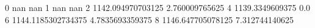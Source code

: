 0 nan nan
1 nan nan
2 1142.094970703125 2.760009765625
4 1139.3349609375 0.0
6 1144.1185302734375 4.7835693359375
8 1146.647705078125 7.312744140625
